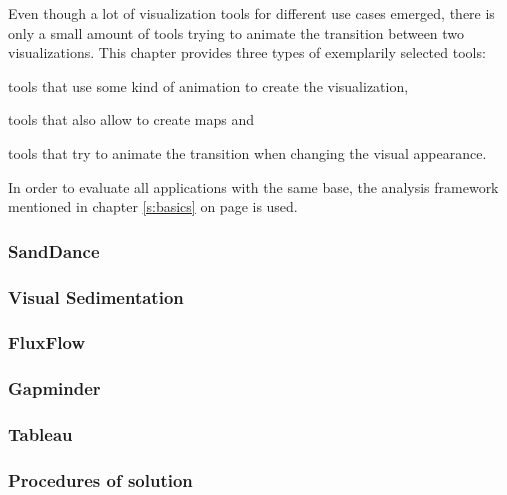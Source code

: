 Even though a lot of visualization tools for different use cases emerged, there is only a small amount of tools trying to animate the transition between two visualizations. This chapter provides three types of exemplarily selected tools:

\begin{enumerate*}
\item tools that use some kind of animation to create the visualization,
\item tools that also allow to create maps and
\item tools that try to animate the transition when changing the visual appearance.
\end{enumerate*}

In order to evaluate all applications with the same base, the analysis framework mentioned in chapter \ref{s:basics} on page \pageref{s:basics} is used.

\subsubsection{SandDance}


\subsubsection{Visual Sedimentation}


\subsubsection{FluxFlow}


\subsubsection{Gapminder}


\subsubsection{Tableau}


\subsubsection{Procedures of solution}
